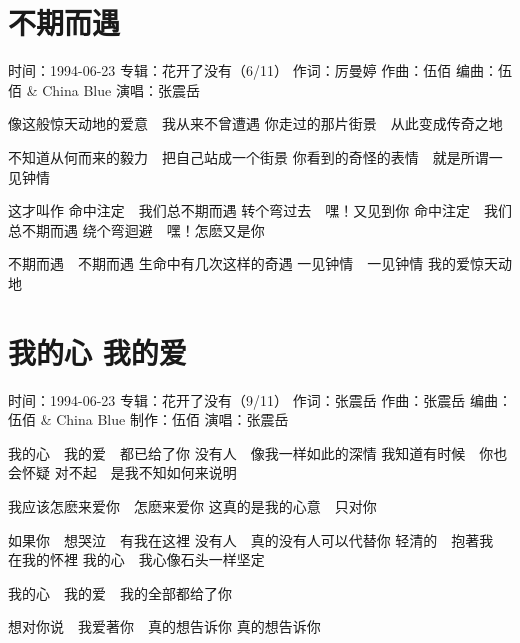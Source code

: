 \documentclass[UTF8,a4paper,oneside,twocolumn,12pt]{ctexbook}
\newcommand{\infopair}[2]{\textbullet #1：#2}
\newcommand{\zc}[1][伍佰]{\infopair{作词}{#1}}
\newcommand{\zq}[1][伍佰]{\infopair{作曲}{#1}}
\newcommand{\bq}[1][伍佰]{\infopair{编曲}{#1}}
\newcommand{\zj}[1]{\infopair{专辑}{#1}}
\newcommand{\zz}[1]{\infopair{制作}{#1}}
\newcommand{\sj}[1]{\infopair{时间}{#1}}
\newenvironment{info}{\begin{flushleft}\kaishu
	}
	{\end{flushleft}\normalsize\yahei\par}
\newenvironment{lyric}{
	}
{}
\begin{document}
\section{不期而遇}
\begin{info}
	\sj{1994-06-23}
	\zj{花开了没有（6/11）}
	\zc[厉曼婷]
	\zq
	\bq[伍佰 \& China Blue]
	\infopair{演唱}{张震岳}
\end{info}
\begin{lyric}
	像这般惊天动地的爱意　我从来不曾遭遇
	你走过的那片街景　从此变成传奇之地

	不知道从何而来的毅力　把自己站成一个街景
	你看到的奇怪的表情　就是所谓一见钟情

	这才叫作
	命中注定　我们总不期而遇
	转个弯过去　嘿！又见到你
	命中注定　我们总不期而遇
	绕个弯迴避　嘿！怎麽又是你

	不期而遇　不期而遇
	生命中有几次这样的奇遇
	一见钟情　一见钟情
	我的爱惊天动地
\end{lyric}

\section{我的心 我的爱}
\begin{info}
	\sj{1994-06-23}
	\zj{花开了没有（9/11）}
	\zc[张震岳]
	\zq[张震岳]
	\bq[伍佰 \& China Blue]
	\zz{伍佰}
	\infopair{演唱}{张震岳}
\end{info}
\begin{lyric}
	我的心　我的爱　都已给了你
	没有人　像我一样如此的深情
	我知道有时候　你也会怀疑
	对不起　是我不知如何来说明

	我应该怎麽来爱你　怎麽来爱你
	这真的是我的心意　只对你

	如果你　想哭泣　有我在这裡
	没有人　真的没有人可以代替你
	轻清的　抱著我　在我的怀裡
	我的心　我心像石头一样坚定

	我的心　我的爱　我的全部都给了你

	想对你说　我爱著你　真的想告诉你
	真的想告诉你
\end{lyric}
\end{document}
